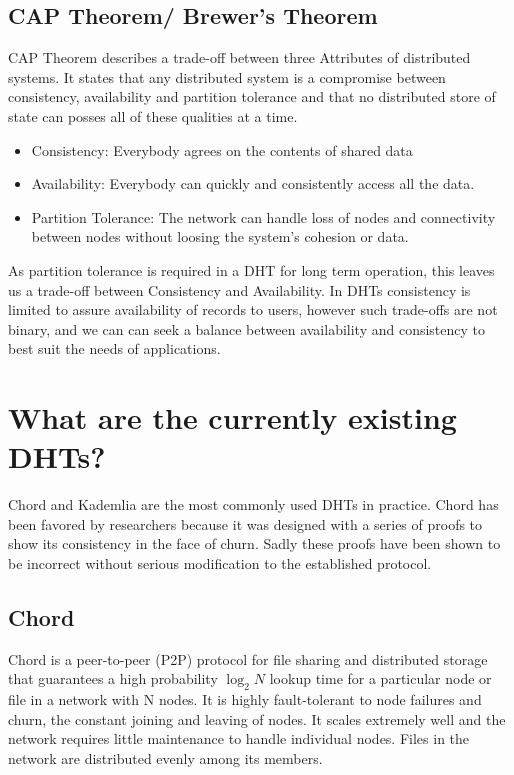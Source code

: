 \subsection{CAP Theorem/ Brewer’s Theorem}
CAP Theorem describes a trade-off between three Attributes of distributed systems.
It states that any distributed system is a compromise between consistency, availability and partition tolerance and that no distributed store of state can posses all of these qualities at a time.
\begin{itemize}
\item Consistency: Everybody agrees on the contents of shared data
\item Availability: Everybody can quickly and consistently access all the data.
\item Partition Tolerance: The network can handle loss of nodes and connectivity between nodes without loosing the system's cohesion or data.
\end{itemize}

As partition tolerance is required in a DHT for long term operation, this leaves us a trade-off between Consistency and Availability.
In DHTs consistency is limited to assure availability of records to users, however such trade-offs are not binary, and we can can seek a balance between availability and consistency to best suit the needs of applications.


\section{What are the currently existing DHTs?}

Chord and Kademlia are the most commonly used DHTs in practice. 
Chord has been favored by researchers because it was designed with a series of proofs to show its consistency in the face of churn.
Sadly these proofs have been shown to be incorrect\cite{zave2012using} without serious modification to the established protocol.


\subsection{Chord}
Chord\cite{chord} is a peer-to-peer (P2P) protocol for file sharing and distributed storage that guarantees a high probability $\log_{2} N$  lookup time for a particular node or file in a network with N nodes. 
It is highly fault-tolerant to node failures and churn, the constant joining and leaving of nodes.  It scales extremely well and the network requires little maintenance to handle individual nodes.  
Files in the network are distributed evenly among its members.

